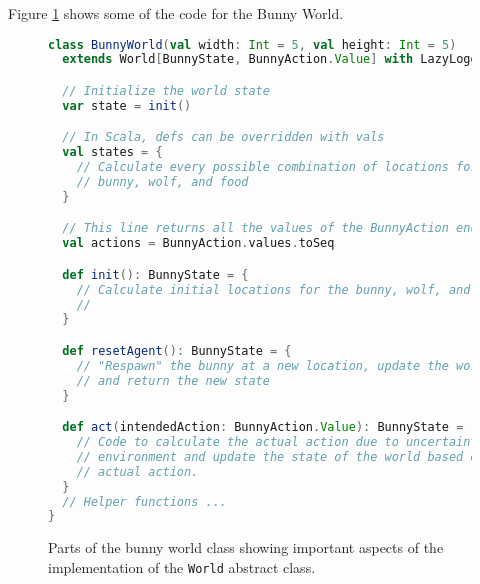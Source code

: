 




Figure \ref{fig:bunny-world-code} shows some of the code for the Bunny World.

\begin{figure}[!h]
\begin{center}
\small
\begin{lstlisting}[language=Scala]
class BunnyWorld(val width: Int = 5, val height: Int = 5)
  extends World[BunnyState, BunnyAction.Value] with LazyLogging {

  // Initialize the world state
  var state = init()

  // In Scala, defs can be overridden with vals
  val states = {
    // Calculate every possible combination of locations for the
    // bunny, wolf, and food
  }

  // This line returns all the values of the BunnyAction enumeration
  val actions = BunnyAction.values.toSeq

  def init(): BunnyState = {
    // Calculate initial locations for the bunny, wolf, and food.
    //
  }

  def resetAgent(): BunnyState = {
    // "Respawn" the bunny at a new location, update the world state
    // and return the new state
  }

  def act(intendedAction: BunnyAction.Value): BunnyState = {
    // Code to calculate the actual action due to uncertainty in the
    // environment and update the state of the world based on the
    // actual action.
  }
  // Helper functions ...
}
\end{lstlisting}
\normalsize
\caption{Parts of the bunny world class showing important aspects of the implementation of the {\tt World} abstract class.}
\end{center}
\label{fig:bunny-world-code}
\end{figure}


